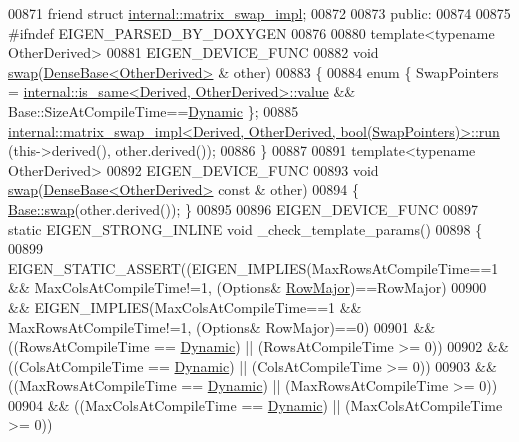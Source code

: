 \begin{DoxyCode}
00871     \textcolor{keyword}{friend} \textcolor{keyword}{struct }\hyperlink{struct_eigen_1_1internal_1_1matrix__swap__impl}{internal::matrix\_swap\_impl};
00872 
00873   \textcolor{keyword}{public}:
00874     
00875 \textcolor{preprocessor}{#ifndef EIGEN\_PARSED\_BY\_DOXYGEN}
00876 
00880     \textcolor{keyword}{template}<\textcolor{keyword}{typename} OtherDerived>
00881     EIGEN\_DEVICE\_FUNC
00882     \textcolor{keywordtype}{void} \hyperlink{endian_8c_a3ca5ecd34b04d6a243c054ac3a57f68d}{swap}(\hyperlink{group___core___module_class_eigen_1_1_dense_base}{DenseBase<OtherDerived>} & other)
00883     \{
00884       \textcolor{keyword}{enum} \{ SwapPointers = \hyperlink{struct_eigen_1_1internal_1_1is__same}{internal::is\_same<Derived, OtherDerived>::value}
       && Base::SizeAtCompileTime==\hyperlink{namespace_eigen_ad81fa7195215a0ce30017dfac309f0b2}{Dynamic} \};
00885       \hyperlink{struct_eigen_1_1internal_1_1matrix__swap__impl}{internal::matrix\_swap\_impl<Derived, OtherDerived, bool(SwapPointers)>::run}
      (this->derived(), other.derived());
00886     \}
00887     
00891     \textcolor{keyword}{template}<\textcolor{keyword}{typename} OtherDerived>
00892     EIGEN\_DEVICE\_FUNC
00893     \textcolor{keywordtype}{void} \hyperlink{endian_8c_a3ca5ecd34b04d6a243c054ac3a57f68d}{swap}(\hyperlink{group___core___module_class_eigen_1_1_dense_base}{DenseBase<OtherDerived>} \textcolor{keyword}{const} & other)
00894     \{ \hyperlink{endian_8c_a3ca5ecd34b04d6a243c054ac3a57f68d}{Base::swap}(other.derived()); \}
00895     
00896     EIGEN\_DEVICE\_FUNC 
00897     \textcolor{keyword}{static} EIGEN\_STRONG\_INLINE \textcolor{keywordtype}{void} \_check\_template\_params()
00898     \{
00899       EIGEN\_STATIC\_ASSERT((EIGEN\_IMPLIES(MaxRowsAtCompileTime==1 && MaxColsAtCompileTime!=1, (Options&
      \hyperlink{group__enums_ggaacded1a18ae58b0f554751f6cdf9eb13acfcde9cd8677c5f7caf6bd603666aae3}{RowMajor})==RowMajor)
00900                         && EIGEN\_IMPLIES(MaxColsAtCompileTime==1 && MaxRowsAtCompileTime!=1, (Options&
      RowMajor)==0)
00901                         && ((RowsAtCompileTime == \hyperlink{namespace_eigen_ad81fa7195215a0ce30017dfac309f0b2}{Dynamic}) || (RowsAtCompileTime >= 0))
00902                         && ((ColsAtCompileTime == \hyperlink{namespace_eigen_ad81fa7195215a0ce30017dfac309f0b2}{Dynamic}) || (ColsAtCompileTime >= 0))
00903                         && ((MaxRowsAtCompileTime == \hyperlink{namespace_eigen_ad81fa7195215a0ce30017dfac309f0b2}{Dynamic}) || (MaxRowsAtCompileTime >= 0))
00904                         && ((MaxColsAtCompileTime == \hyperlink{namespace_eigen_ad81fa7195215a0ce30017dfac309f0b2}{Dynamic}) || (MaxColsAtCompileTime >= 0))

\end{DoxyCode}
